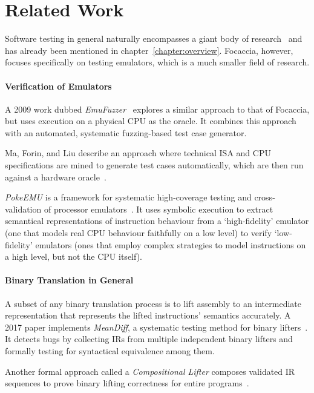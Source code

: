 \chapter{Related Work}

Software testing in general naturally encompasses a giant body of research~\cite{Daka+2014UnitTestingSurvey,
Fraser2019SoftwareTesting, Garousi+2016SoftwareTestingLitRev} and has already been mentioned in
chapter~\ref{chapter:overview}. Focaccia, however, focuses specifically on testing emulators, which is a much smaller
field of research.

\subsubsection{Verification of Emulators}

A 2009 work dubbed \textit{EmuFuzzer}~\cite{Martignoni+2009TestingCpuEmulators} explores a similar approach to that of
Focaccia, but uses execution on a physical CPU as the oracle. It combines this approach with an automated, systematic
fuzzing-based test case generator.

Ma, Forin, and Liu describe an approach where technical \ac{ISA} and CPU specifications are mined to generate test cases
automatically, which are then run against a hardware oracle~\cite{Ma+2010PrototypingAndTestingEmulators}.

\textit{PokeEMU} is a framework for systematic high-coverage testing and cross-validation of processor
emulators~\cite{Martignoni+2012PokeEmu}. It uses symbolic execution to extract semantical representations of instruction
behaviour from a `high-fidelity' emulator (one that models real CPU behaviour faithfully on a low level) to verify
`low-fidelity' emulators (ones that employ complex strategies to model instructions on a high level, but not the CPU
itself).

\subsubsection{Binary Translation in General}

A subset of any binary translation process is to lift assembly to an intermediate representation that represents the
lifted instructions' semantics accurately. A 2017 paper implements \textit{MeanDiff}, a systematic testing method for
binary lifters~\cite{Kim+2017TestBinaryLifters}. It detects bugs by collecting \ac{IR}s from multiple independent binary
lifters and formally testing for syntactical equivalence among them.

Another formal approach called a \textit{Compositional Lifter} composes validated IR sequences to prove binary lifting
correctness for entire programs~\cite{Dasgupta+2020CompLifter}.
